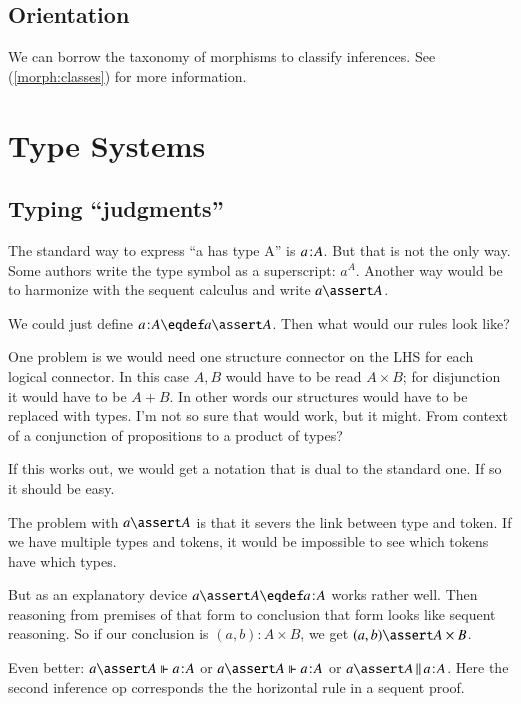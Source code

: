 \documentclass{article}
\begin{document}
\subsection{Orientation}

We can borrow the taxonomy of morphisms to classify inferences. See
(\ref{morph:classes}) for more information.

\section{Type Systems}

\subsection{Typing ``judgments''}

The standard way to express ``a has type A'' is \(a\hspace{1pt}\mathpunct{:}\hspace{-1pt}A\). But that is
not the only way. Some authors write the type symbol as a superscript:
\(a^A\). Another way would be to harmonize with the sequent calculus
and write \(a\linfer A\).

We could just define \(\tj{a}{A}\eqdef a\linfer A\). Then what would our
rules look like?


One problem is we would need one structure connector on the LHS for
each logical connector. In this case \(A,B\) would have to be read
\(A\times B\); for disjunction it would have to be \(A\plus B\). In
other words our structures would have to be replaced with types. I'm
not so sure that would work, but it might. From context of a
conjunction of propositions to a product of types?


If this works out, we would get a notation that is dual to the
standard one. If so it should be easy.

The problem with \(a\linfer A\) is that it severs the link between type
and token. If we have multiple types and tokens, it would be
impossible to see which tokens have which types.

But as an explanatory device \(a\lso A\eqdef \tj{a}{A}\) works rather
well. Then reasoning from premises of that form to conclusion that
form looks like sequent reasoning. So if our conclusion is
\((a,b):A\times B\), we get \( (a,b)\lso A\times B\).

Even better: \(a\lso A\pso\tj{a}{A}\) or \(a\lso A\Vdash\tj{a}{A}\) or
\(a\lso A\,\Vert\,\tj{a}{A}\). Here the second inference op corresponds
the the horizontal rule in a sequent proof.
\end{document}
